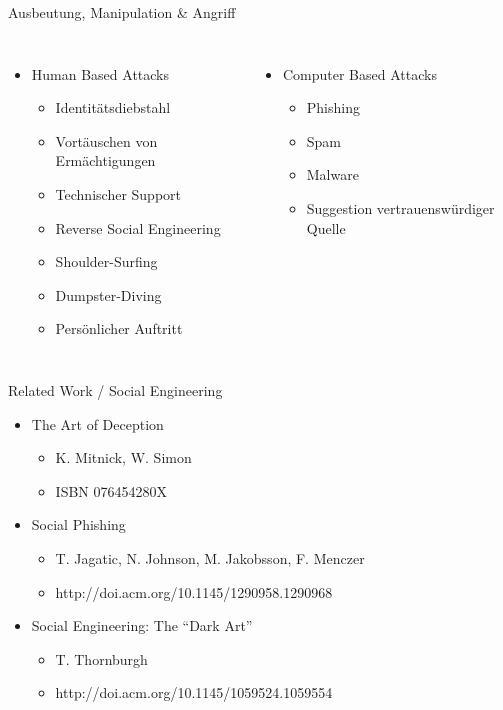 \documentclass[11pt]{beamer}
\begin{document}
\begin{frame}[t]{Ausbeutung, Manipulation \& Angriff}
  \begin{columns}
  \vspace{3.8em}
  \begin{itemize}
    \item Human Based Attacks
    \begin{itemize}
      \item Identitätsdiebstahl
      \item Vortäuschen von Ermächtigungen
      \item Technischer Support
      \item Reverse Social Engineering
      \item Shoulder-Surfing
      \item Dumpster-Diving
      \item Persönlicher Auftritt
    \end{itemize}
  \end{itemize}
  \pause
  \begin{itemize}
    \item Computer Based Attacks
    \begin{itemize}
      \item Phishing
      \item Spam
      \item Malware
      \item Suggestion vertrauenswürdiger Quelle
    \end{itemize}
  \end{itemize}
  \end{columns}
\end{frame}

\begin{frame}{Related Work / Social Engineering}
  \begin{itemize}
    \item The Art of Deception
    \begin{itemize}
      \item K. Mitnick, W. Simon
      \item ISBN 076454280X
    \end{itemize}
    \item Social Phishing
    \begin{itemize}
      \item T. Jagatic, N. Johnson, M. Jakobsson, F. Menczer
      \item http://doi.acm.org/10.1145/1290958.1290968
    \end{itemize}
    \item Social Engineering: The “Dark Art”
    \begin{itemize}
      \item T. Thornburgh
      \item http://doi.acm.org/10.1145/1059524.1059554
    \end{itemize}
  \end{itemize}
\end{frame}
\end{document}
